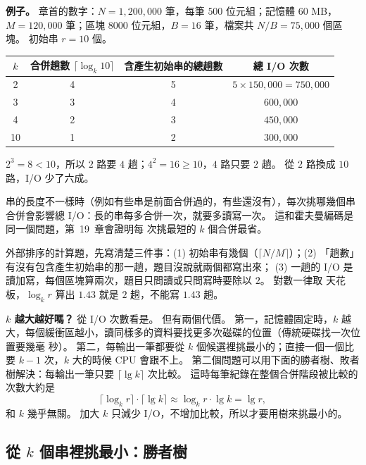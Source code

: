 \textbf{例子。} 章首的數字：$N = 1{,}200{,}000$ 筆，每筆 $500$ 位元組；記憶體 $60$ MB，
$M = 120{,}000$ 筆；區塊 $8000$ 位元組，$B = 16$ 筆，檔案共 $N/B = 75{,}000$ 個區
塊。 初始串 $r = 10$ 個。

\begin{center}
\begin{tabular}{cccc}
\toprule
$k$ & 合併趟數 $\lceil \log_k 10 \rceil$ & 含產生初始串的總趟數 & 總 I/O 次數 \\
\midrule
2 & 4 & 5 & $5 \times 150{,}000 = 750{,}000$ \\
3 & 3 & 4 & $600{,}000$ \\
4 & 2 & 3 & $450{,}000$ \\
10 & 1 & 2 & $300{,}000$ \\
\bottomrule
\end{tabular}
\end{center}

$2^3 = 8 < 10$，所以 $2$ 路要 $4$ 趟；$4^2 = 16 \ge 10$，$4$ 路只要 $2$ 趟。 從
$2$ 路換成 $10$ 路，I/O 少了六成。

串的長度不一樣時（例如有些串是前面合併過的，有些還沒有），每次挑哪幾個串合併會影響總
I/O：長的串每多合併一次，就要多讀寫一次。 這和霍夫曼編碼是同一個問題，第~19~章會證明每
次挑最短的 $k$ 個合併最省。

\begin{examnote}
外部排序的計算題，先寫清楚三件事：(1) 初始串有幾個（$\lceil N/M \rceil$）；(2) 「趟數」有沒有包含產生初始串的那一趟，題目沒說就兩個都寫出來；
(3) 一趟的 I/O 是讀加寫，每個區塊算兩次，題目只問讀或只問寫時要除以 $2$。 對數一律取
天花板，$\log_k r$ 算出 $1.43$ 就是 $2$ 趟，不能寫 $1.43$ 趟。
\end{examnote}

\textbf{$k$ 越大越好嗎？} 從 I/O 次數看是。 但有兩個代價。 第一，記憶體固定時，$k$ 越
大，每個緩衝區越小，讀同樣多的資料要找更多次磁碟的位置（傳統硬碟找一次位置要幾毫
秒）。 第二，每輸出一筆都要從 $k$ 個候選裡挑最小的；直接一個一個比要 $k - 1$ 次，$k$
大的時候 CPU 會跟不上。 第二個問題可以用下面的勝者樹、敗者樹解決：每輸出一筆只要
$\lceil \lg k \rceil$ 次比較。 這時每筆紀錄在整個合併階段被比較的次數大約是
\[
\lceil \log_k r \rceil \cdot \lceil \lg k \rceil \approx \log_k r \cdot \lg k = \lg r,
\]
和 $k$ 幾乎無關。 加大 $k$ 只減少 I/O，不增加比較，所以才要用樹來挑最小的。

\subsection{從 $k$ 個串裡挑最小：勝者樹}

